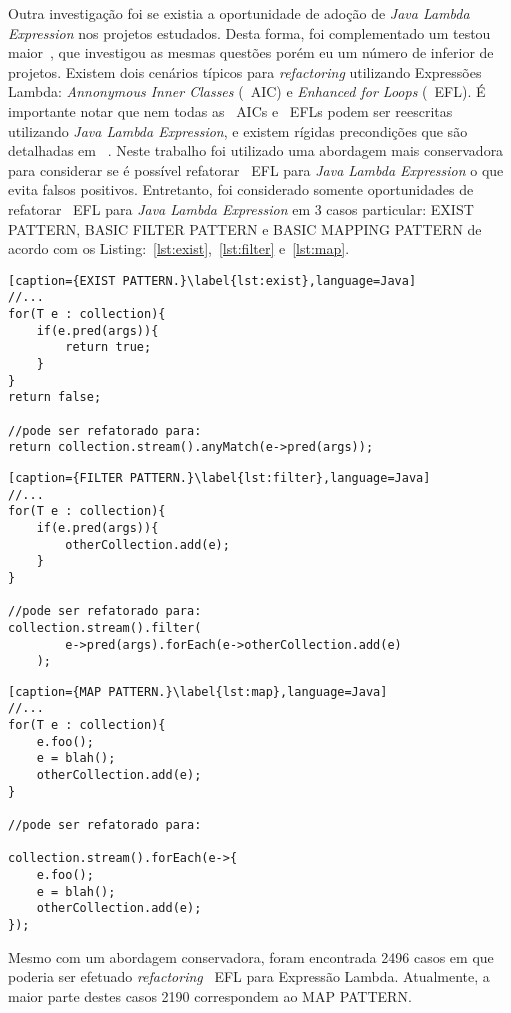 Outra investigação foi se existia a oportunidade de adoção de \textit{Java Lambda Expression} nos projetos estudados. Desta forma, foi complementado um testou maior~\cite{gyori2013crossing},  que investigou as mesmas questões porém eu um número de  inferior de projetos. Existem dois cenários típicos para \textit{refactoring} utilizando Expressões Lambda: \textit{Annonymous Inner Classes} (~\acs{AIC}) e \textit{Enhanced for Loops} (~\acs{EFL}). É importante notar que nem todas as ~\acs{AIC}s e ~\acs{EFL}s podem ser reescritas utilizando \textit{Java Lambda Expression}, e existem rígidas precondições que são detalhadas em ~\cite{gyori2013crossing}. Neste trabalho foi utilizado uma abordagem mais conservadora para considerar se é possível refatorar ~\acl{EFL} para \textit{Java Lambda Expression} o que evita falsos positivos.  Entretanto, foi considerado somente oportunidades de refatorar ~\acs{EFL} para \textit{Java Lambda Expression} em 3 casos particular: EXIST PATTERN, BASIC FILTER PATTERN e BASIC MAPPING PATTERN de acordo com os Listing:~\ref{lst:exist},~\ref{lst:filter} e~\ref{lst:map}.

\begin{lstlisting}[caption={EXIST PATTERN.}\label{lst:exist},language=Java]
//...
for(T e : collection){
	if(e.pred(args)){
		return true;
	}
}
return false;

//pode ser refatorado para:
return collection.stream().anyMatch(e->pred(args));
\end{lstlisting}

\begin{lstlisting}[caption={FILTER PATTERN.}\label{lst:filter},language=Java] 
//...
for(T e : collection){
	if(e.pred(args)){
		otherCollection.add(e);
	}
}

//pode ser refatorado para:
collection.stream().filter(
		e->pred(args).forEach(e->otherCollection.add(e)
	);
\end{lstlisting}

\begin{lstlisting}[caption={MAP PATTERN.}\label{lst:map},language=Java] 
//...
for(T e : collection){
	e.foo();
	e = blah();
	otherCollection.add(e);
}

//pode ser refatorado para:

collection.stream().forEach(e->{
	e.foo();
	e = blah();
	otherCollection.add(e);
});
\end{lstlisting}

Mesmo com um abordagem conservadora, foram encontrada 2496 casos em que poderia ser efetuado \textit{refactoring} ~\acs{EFL} para Expressão Lambda. Atualmente, a maior parte destes casos 2190 correspondem ao MAP PATTERN.

